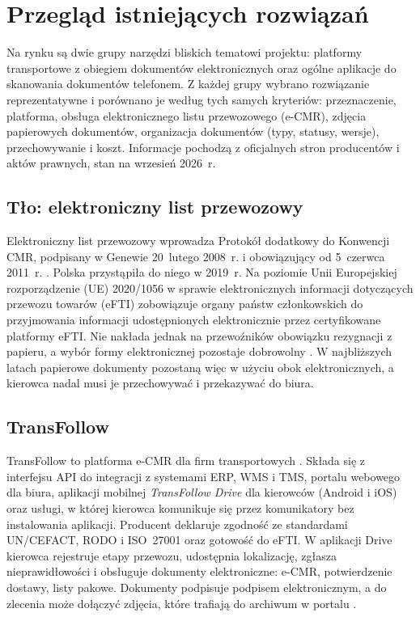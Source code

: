 \section{Przegląd istniejących rozwiązań}
\label{sec:przeglad}

Na rynku są dwie grupy narzędzi bliskich tematowi projektu: platformy
transportowe z obiegiem dokumentów elektronicznych oraz ogólne aplikacje do
skanowania dokumentów telefonem. Z każdej grupy wybrano rozwiązanie
reprezentatywne i porównano je według tych samych kryteriów: przeznaczenie,
platforma, obsługa elektronicznego listu przewozowego (e-CMR), zdjęcia
papierowych dokumentów, organizacja dokumentów (typy, statusy, wersje),
przechowywanie i koszt. Informacje pochodzą z oficjalnych stron producentów
i aktów prawnych, stan na wrzesień 2026~r.

\subsection{Tło: elektroniczny list przewozowy}

Elektroniczny list przewozowy wprowadza Protokół dodatkowy do Konwencji CMR,
podpisany w Genewie 20~lutego 2008~r. i obowiązujący od 5~czerwca 2011~r.
\cite{un_ecmr_protokol}. Polska przystąpiła do niego w 2019~r. Na poziomie
Unii Europejskiej rozporządzenie (UE) 2020/1056 w sprawie elektronicznych
informacji dotyczących przewozu towarów (eFTI) zobowiązuje organy państw
członkowskich do przyjmowania informacji udostępnionych elektronicznie przez
certyfikowane platformy eFTI. Nie nakłada jednak na przewoźników obowiązku
rezygnacji z papieru, a wybór formy elektronicznej pozostaje dobrowolny
\cite{efti_rozporzadzenie}. W najbliższych latach papierowe dokumenty
pozostaną więc w użyciu obok elektronicznych, a kierowca nadal musi je
przechowywać i przekazywać do biura.

\subsection{TransFollow}

TransFollow to platforma e-CMR dla firm transportowych \cite{transfollow}.
Składa się z interfejsu API do integracji z systemami ERP, WMS i TMS, portalu
webowego dla biura, aplikacji mobilnej \emph{TransFollow Drive} dla kierowców
(Android i iOS) oraz usługi, w której kierowca komunikuje się przez
komunikatory bez instalowania aplikacji. Producent deklaruje zgodność ze
standardami UN/CEFACT, RODO i ISO~27001 oraz gotowość do eFTI.
W aplikacji Drive kierowca rejestruje etapy przewozu, udostępnia lokalizację,
zgłasza nieprawidłowości i obsługuje dokumenty elektroniczne: e-CMR,
potwierdzenie dostawy, listy pakowe. Dokumenty podpisuje podpisem
elektronicznym, a do zlecenia może dołączyć zdjęcia, które trafiają do
archiwum w portalu \cite{transfollow}.

